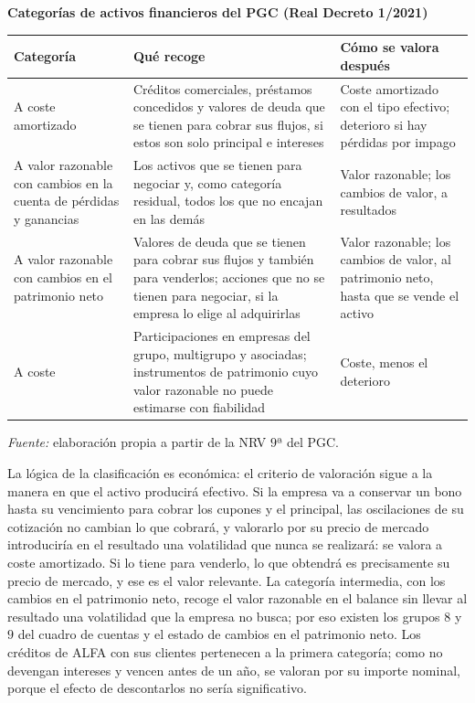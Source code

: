 \documentclass[10pt,a4paper]{article}
\begin{document}
\begin{center}\begin{minipage}{\linewidth}\centering
{\small\textbf{Categorías de activos financieros del PGC (Real Decreto 1/2021)}}\par\vspace{0.3em}
{\small
\begin{tabular}{p{3.4cm} p{5.6cm} p{5.4cm}}
\hline
\textbf{Categoría} & \textbf{Qué recoge} & \textbf{Cómo se valora después} \\
\hline
\raggedright A coste amortizado & \raggedright Créditos comerciales, préstamos concedidos y valores de deuda que se tienen para cobrar sus flujos, si estos son solo principal e intereses & \raggedright Coste amortizado con el tipo efectivo; deterioro si hay pérdidas por impago \tabularnewline
\raggedright A valor razonable con cambios en la cuenta de pérdidas y ganancias & \raggedright Los activos que se tienen para negociar y, como categoría residual, todos los que no encajan en las demás & \raggedright Valor razonable; los cambios de valor, a resultados \tabularnewline
\raggedright A valor razonable con cambios en el patrimonio neto & \raggedright Valores de deuda que se tienen para cobrar sus flujos y también para venderlos; acciones que no se tienen para negociar, si la empresa lo elige al adquirirlas & \raggedright Valor razonable; los cambios de valor, al patrimonio neto, hasta que se vende el activo \tabularnewline
\raggedright A coste & \raggedright Participaciones en empresas del grupo, multigrupo y asociadas; instrumentos de patrimonio cuyo valor razonable no puede estimarse con fiabilidad & \raggedright Coste, menos el deterioro \tabularnewline
\hline
\end{tabular}}\par\vspace{0.3em}
{\small\textit{Fuente: }elaboración propia a partir de la NRV $9$ª del PGC.}
\end{minipage}\end{center}

La lógica de la clasificación es económica: el criterio de valoración sigue a la manera en que el activo producirá efectivo. Si la empresa va a conservar un bono hasta su vencimiento para cobrar los cupones y el principal, las oscilaciones de su cotización no cambian lo que cobrará, y valorarlo por su precio de mercado introduciría en el resultado una volatilidad que nunca se realizará: se valora a coste amortizado. Si lo tiene para venderlo, lo que obtendrá es precisamente su precio de mercado, y ese es el valor relevante. La categoría intermedia, con los cambios en el patrimonio neto, recoge el valor razonable en el balance sin llevar al resultado una volatilidad que la empresa no busca; por eso existen los grupos $8$ y $9$ del cuadro de cuentas y el estado de cambios en el patrimonio neto. Los créditos de ALFA con sus clientes pertenecen a la primera categoría; como no devengan intereses y vencen antes de un año, se valoran por su importe nominal, porque el efecto de descontarlos no sería significativo.
\end{document}
